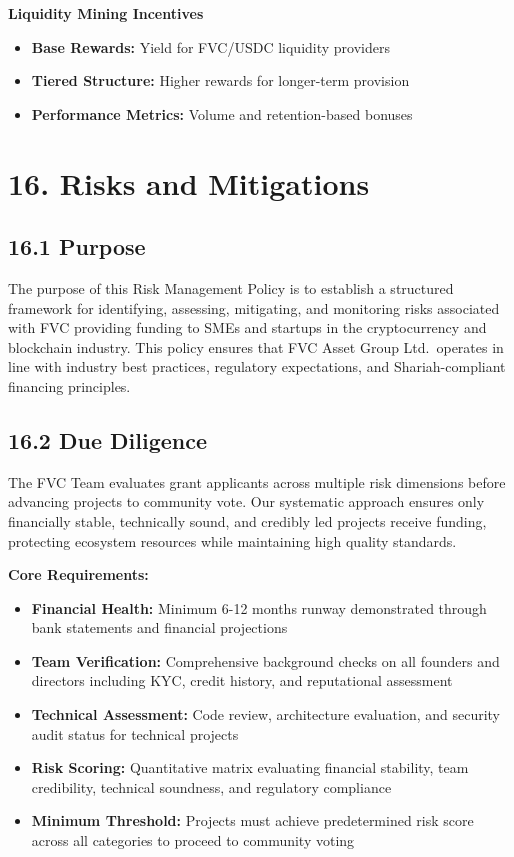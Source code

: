 \documentclass[
  paper=a4,
  ,captions=tableheading
]{scrartcl}
\providecommand{\tightlist}{%
  \setlength{\itemsep}{0pt}\setlength{\parskip}{0pt}}
\begin{document}
\textbf{Liquidity Mining Incentives}

\begin{itemize}
\tightlist
\item
  \textbf{Base Rewards:} Yield for FVC/USDC liquidity providers
\item
  \textbf{Tiered Structure:} Higher rewards for longer-term provision
\item
  \textbf{Performance Metrics:} Volume and retention-based bonuses
\end{itemize}

\section{16. Risks and Mitigations}\label{risks-and-mitigations}

\subsection{16.1 Purpose}\label{purpose}

The purpose of this Risk Management Policy is to establish a structured
framework for identifying, assessing, mitigating, and monitoring risks
associated with FVC providing funding to SMEs and startups in the cryptocurrency and blockchain
industry. This policy ensures that FVC Asset Group Ltd.~operates in line
with industry best practices, regulatory expectations, and
Shariah-compliant financing principles.

\subsection{16.2 Due Diligence}\label{due-diligence}

The FVC Team evaluates grant applicants across multiple risk dimensions
before advancing projects to community vote. Our systematic approach
ensures only financially stable, technically sound, and credibly led
projects receive funding, protecting ecosystem resources while
maintaining high quality standards.

\textbf{Core Requirements:}

\begin{itemize}
\tightlist
\item
  \textbf{Financial Health:} Minimum 6-12 months runway demonstrated
  through bank statements and financial projections
\item
  \textbf{Team Verification:} Comprehensive background checks on all
  founders and directors including KYC, credit history, and reputational
  assessment
\item
  \textbf{Technical Assessment:} Code review, architecture evaluation,
  and security audit status for technical projects
\item
  \textbf{Risk Scoring:} Quantitative matrix evaluating financial
  stability, team credibility, technical soundness, and regulatory
  compliance
\item
  \textbf{Minimum Threshold:} Projects must achieve predetermined risk
  score across all categories to proceed to community voting
\end{itemize}
\end{document}
